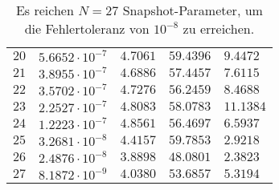 \begin{table}[h!]
\begin{center}
\begin{tabular}{r|llll}
            $20$ & $5.6652 \cdot 10^{-7}$ & $4.7061$ & $59.4396$ & $9.4472$ \\
            $21$ & $3.8955 \cdot 10^{-7}$ & $4.6886$ & $57.4457$ & $7.6115$ \\
            $22$ & $3.5702 \cdot 10^{-7}$ & $4.7276$ & $56.2459$ & $8.4688$ \\
            $23$ & $2.2527 \cdot 10^{-7}$ & $4.8083$ & $58.0783$ & $11.1384$ \\
            $24$ & $1.2223 \cdot 10^{-7}$ & $4.8561$ & $56.4697$ & $6.5937$ \\
            $25$ & $3.2681 \cdot 10^{-8}$ & $4.4157$ & $59.7853$ & $2.9218$ \\
            $26$ & $2.4876 \cdot 10^{-8}$ & $3.8898$ & $48.0801$ & $2.3823$ \\
            $27$ & $8.1872 \cdot 10^{-9}$ & $4.0380$ & $53.6857$ & $5.3194$
        \end{tabular}
        \caption{Es reichen $N = 27$ Snapshot-Parameter, um die Fehlertoleranz von $10^{-8}$ zu erreichen.}
        \label{tab:dreidim}
    \end{center}
\end{table}



